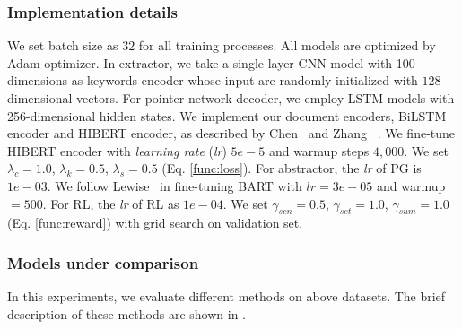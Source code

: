 \subsubsection{Implementation details}
We set batch size as $32$ for all training processes.
All models are optimized by Adam optimizer.
In extractor, we take a single-layer CNN model with 100 dimensions
as keywords encoder whose input are randomly initialized with $128$-dimensional 
vectors.
For pointer network decoder, we employ LSTM
models with 256-dimensional hidden states.
We implement our document encoders, BiLSTM encoder and HIBERT encoder,
as described by Chen~ and Zhang ~.
We fine-tune HIBERT encoder with {\em learning rate} ({\em lr}) $5e-5$ and warmup steps $4,000$.
We set $\lambda_{c}=1.0$, 
$\lambda_{k} = 0.5$,
$\lambda_{s} = 0.5$ (Eq. \ref{func:loss}).
For abstractor, the {\em lr} of PG is $1e-03$.
We follow Lewise~ in fine-tuning BART with
$lr=3e-05$ and warmup $=500$.
For RL, the {\em lr} of RL as $1e-04$. 
We set $\gamma_{sen} = 0.5$, 
$\gamma_{set} = 1.0$,
$\gamma_{sum} = 1.0$ (Eq. \ref{func:reward}) with grid
search on validation set.

\subsubsection{Models under comparison}
In this experiments, we evaluate different methods on above datasets.
The brief description of these methods are shown in .

